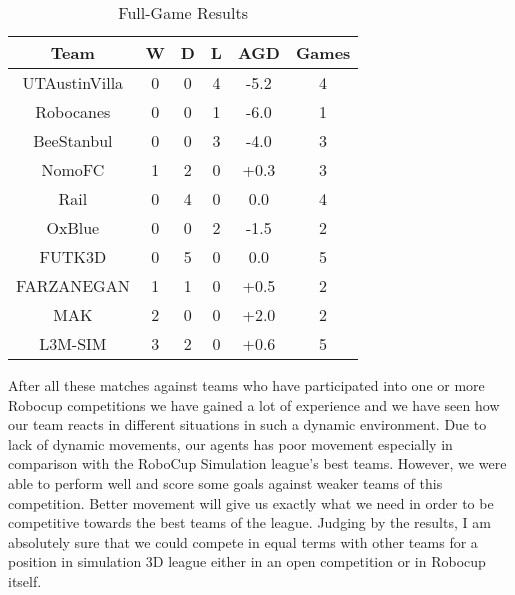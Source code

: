 \begin{table}
\begin{center}
    \begin{tabular}{cccccc}
    \textbf{Team} 	& \textbf{W} & \textbf{D} & \textbf{L} & \textbf{AGD}\footnotemark 	& \textbf{Games}   \\
    \midrule
    UTAustinVilla 	& 0		& 0		& 4		& -5.2		& 4 			\\
    Robocanes 		& 0		& 0		& 1		& -6.0		& 1 			\\
    BeeStanbul		& 0		& 0		& 3		& -4.0		& 3				\\
    NomoFC 			& 1		& 2		& 0		& +0.3 		& 3 			\\
    Rail 			& 0		& 4		& 0		& 0.0 		& 4 			\\
    OxBlue 			& 0		& 0		& 2		& -1.5 		& 2 			\\
    FUTK3D 			& 0		& 5		& 0		& 0.0 		& 5 			\\
    FARZANEGAN 		& 1		& 1		& 0		& +0.5 		& 2 			\\
    MAK 			    & 2		& 0		& 0		& +2.0 		& 2 			\\
    L3M-SIM			& 3		& 2   	& 0		& +0.6 		& 5 			\\     
    \end{tabular}
\end{center}
\label{GameResults}
\caption{Full-Game Results}
\end{table}




After all these matches against teams who have participated into one or more Robocup competitions we have gained a lot of experience and we have seen how our team reacts in different situations in such a dynamic environment. Due to lack of dynamic movements, our agents has poor movement especially in comparison with the RoboCup Simulation league's best teams. However, we were able to perform well and score some goals against weaker teams of this competition. Better movement will give us exactly what we need in order to be competitive towards the best teams of the league. Judging by the results, I am absolutely sure that we could compete in equal terms with other teams for a position in simulation 3D league either in an open competition or in Robocup itself.

